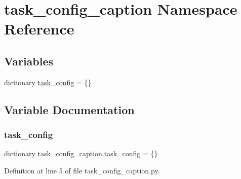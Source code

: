 \hypertarget{namespacetask__config__caption}{}\section{task\+\_\+config\+\_\+caption Namespace Reference}
\label{namespacetask__config__caption}
\subsection*{Variables}
\begin{DoxyCompactItemize}
\item 
dictionary \hyperlink{namespacetask__config__caption_ab251a9dfc92c15b8ef47e9948943d705}{task\+\_\+config} = \{\}
\end{DoxyCompactItemize}


\subsection{Variable Documentation}
\mbox{\label{namespacetask__config__caption_ab251a9dfc92c15b8ef47e9948943d705}} 
\subsubsection{\texorpdfstring{task\+\_\+config}{task\_config}}
{\footnotesize\ttfamily dictionary task\+\_\+config\+\_\+caption.\+task\+\_\+config = \{\}}



Definition at line 5 of file task\+\_\+config\+\_\+caption.\+py.

